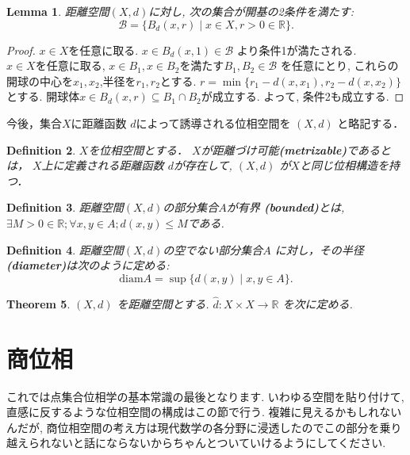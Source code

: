 \documentclass[dvipdfmx]{jbook}
\newtheorem{theorem}{Theorem}[section]
\newtheorem{lemma}[theorem]{Lemma}
\newtheorem{definition}[theorem]{Definition}
\theoremstyle{remark}
\theoremstyle{plain}
\begin{document}
\begin{lemma}
	距離空間$(X,d)$に対し, 次の集合が開基の2条件を満たす:
	 \[
	 \mathcal{B} = \{ B_d(x,r)  \mid  x \in X, r >0 \in \mathbb{R}\} 
	 .\] 
\end{lemma}

\begin{proof}
	$x \in X$を任意に取る.  $x \in B_d(x,1) \in \mathcal{B}$ より条件1が満たされる.\\
	$x \in X$を任意に取る,  $x \in B_1, x \in B_2$を満たす$B_1,B_2 \in \mathcal{B}$ を任意にとり, これらの開球の中心を$x_1,x_2$,半径を$r_1,r_2$とする. $r = \min \{ r_1 - d(x,x_1), r_2 -d(x,x_2)\} $ とする. 開球体$ x \in B_d(x,r) \subseteq  B_1 \cap B_2$が成立する. よって, 条件2も成立する.
\end{proof}

今後，集合$X$に距離函数 $d$によって誘導される位相空間を $\left( X,d \right) $ と略記する．

\begin{definition}
	$X$を位相空間とする． $X$が距離づけ可能\textbf{(metrizable)}であるとは， $X$上に定義される距離函数 $d$が存在して,  $\left( X,d \right) $ が$X$と同じ位相構造を持つ．
\end{definition}
\begin{definition}
	距離空間$\left( X, d \right) $の部分集合$A$が有界 \textbf{(bounded)}とは,  $\exists M>0 \in \mathbb{R}; \forall x, y \in A; d(x,y) \le M$である.
\end{definition}

\begin{definition}
	距離空間$\left( X ,d \right) $の空でない部分集合$A$ に対し，その半径\textbf{(diameter)}は次のように定める:
	\[
		\mathrm{diam}A= \sup \{d(x,y)  \mid x,y \in A\} 
	.\] 
\end{definition}

\begin{theorem}
	$\left( X,d \right) $ を距離空間とする. $ \hat{d}: X \times X \to \mathbb{R} $ を次に定める.
\end{theorem}
\section{商位相}

これでは点集合位相学の基本常識の最後となります.
いわゆる空間を貼り付けて, 直感に反するような位相空間の構成はこの節で行う.
複雑に見えるかもしれないんだが, 商位相空間の考え方は現代数学の各分野に浸透したのでこの部分を乗り越えられないと話にならないからちゃんとついていけるようにしてください. 
\end{document}
